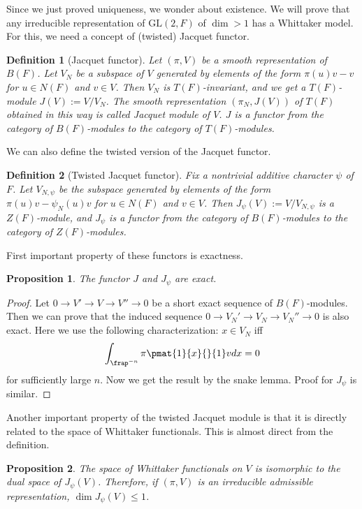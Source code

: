 \documentclass{article}
\newtheorem{definition}{Definition}[section]
\newcommand{\GL}{\mathrm{GL}}
\newtheorem{proposition}{Proposition}[section]
\begin{document}
Since we just proved uniqueness, we wonder about existence. We will prove that any irreducible representation of $\GL(2, F)$ of $\dim >1$ has a Whittaker model. For this, we need a concept of (twisted) Jacquet functor.
\begin{definition}[Jacquet functor]
Let $(\pi, V)$ be a smooth representation of $B(F)$. Let $V_N$ be a subspace of $V$ generated by elements of the form $\pi(u)v - v$ for $u\in N(F)$ and $v\in V$. 
Then $V_N$ is $T(F)$-invariant, and we get a $T(F)$-module $J(V):= V/V_N$. The smooth representation $(\pi_N, J(V))$ of $T(F)$ obtained in this way is called Jacquet module of $V$. 
$J$ is a functor from the category of $B(F)$-modules to the category of $T(F)$-modules. 
\end{definition}
We can also define the twisted version of the Jacquet functor. 
\begin{definition}[Twisted Jacquet functor]
Fix a nontrivial additive character $\psi$ of $F$. 
Let $V_{N, \psi}$ be the subspace generated by elements of the form $\pi(u)v - \psi_{N}(u)v$ for $u\in N(F)$ and $v\in V$. Then $J_{\psi}(V) := V/V_{N, \psi}$ is a $Z(F)$-module, and $J_{\psi}$ is a functor from the category of $B(F)$-modules to the category of $Z(F)$-modules. 
\end{definition}
First important property of these functors is exactness. 
\begin{proposition}
The functor $J$ and $J_{\psi}$ are exact. 
\end{proposition}
\begin{proof}
Let $0\to V'\to V\to V'' \to 0$ be a short exact sequence of $B(F)$-modules. 
Then we can prove that the induced sequence $0\to V_{N}' \to V_N \to V_{N}'' \to 0$ is also exact. Here we use the following characterization: $x\in V_N$ iff 
$$
\int_{\frap^{-n}} \pi\pmat{1}{x}{}{1} v dx = 0
$$
for sufficiently large $n$. Now we get the result by the snake lemma. 
Proof for $J_{\psi}$ is similar. 
\end{proof}

Another important property of the twisted Jacquet module is that it is directly related to the space of Whittaker functionals. This is almost direct from the definition. 
\begin{proposition}
The space of Whittaker functionals on $V$ is isomorphic to the dual space of $J_{\psi}(V)$. Therefore, if $(\pi, V)$ is an irreducible admissible representation, $\dim J_{\psi}(V) \leq 1$.
\end{proposition}
\end{document}
